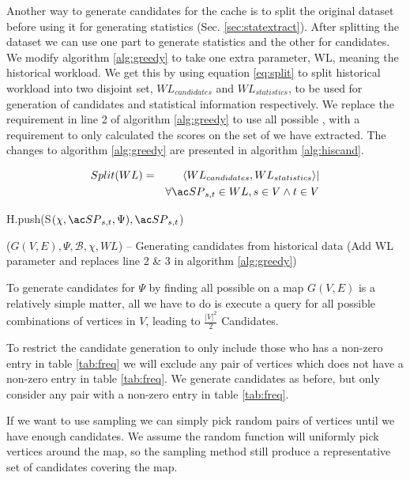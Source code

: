 Another way to generate candidates for the cache is to split the original dataset before using it for generating statistics (Sec. \ref{sec:statextract}). 
After splitting the dataset we can use one part to generate statistics and the other for candidates. We modify algorithm \ref{alg:greedy} to take one extra parameter, WL, meaning the historical workload. We get this by using equation \ref{eq:split} to split historical workload into two disjoint set, $WL_{candidates}$ and $WL_{statistics}$, to be used for generation of candidates and statistical information respectively. We replace the requirement in line 2 of algorithm \ref{alg:greedy} to use all possible \spathsns, with a requirement to only calculated the scores on the set of \spaths we have extracted. The changes to algorithm \ref{alg:greedy} are presented in algorithm \ref{alg:hiscand}.


\begin{eqnarray} \label{eq:split}
Split({WL}) &=& \langle WL_{candidates}, WL_{statistics} \rangle | \nonumber \\
	    & & \forall \spath_{s,t} \in WL, s \in V \wedge t \in V 
\end{eqnarray}


\begin{algorithm} [H!bt]
\dontprintsemicolon
\SetVline

{
    H.push(S$(\chi, \spath_{s,t}, \Psi), \spath_{s,t}$) \;
}

\caption{\salgons($G(V,E), \Psi, \mathcal{B}, \chi, WL$) -- Generating candidates from historical data (Add WL parameter and replaces line 2 \& 3 in algorithm \ref{alg:greedy})}
\label{alg:hiscand}
\end{algorithm}

To generate \spath candidates for $\Psi$ by finding all possible \spath on a map $G(V,E)$ is a relatively simple matter, all we have to do is execute a \spath query for all possible combinations of vertices in $V$, leading to $\frac{|V|^2}{2}$ Candidates.

To restrict the candidate generation to only include those who has a non-zero entry in table \ref{tab:freq} we will exclude any pair of vertices which does not have a non-zero entry in table \ref{tab:freq}. We generate candidates as before, but only consider any pair with a non-zero entry in table \ref{tab:freq}.

If we want to use sampling we can simply pick random pairs of vertices until we have enough candidates. We assume the random function will uniformly pick vertices around the map, so the sampling method still produce a representative set of candidates covering the map.

